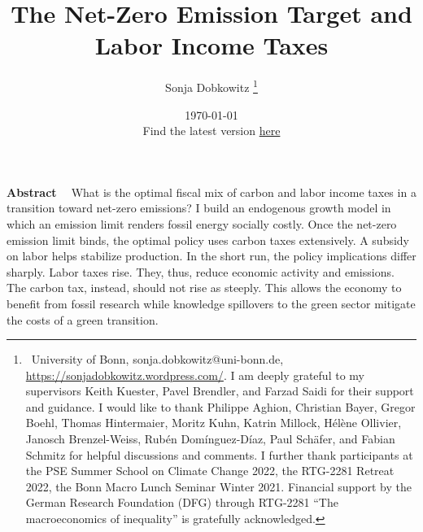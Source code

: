 \documentclass[12pt]{article}
\title{The Net-Zero Emission Target and Labor Income Taxes}
\author{Sonja Dobkowitz
\thanks{\ {University of Bonn, sonja.dobkowitz@uni-bonn.de, \url{https://sonjadobkowitz.wordpress.com/}.} \newline
	I am deeply grateful to my supervisors Keith Kuester, Pavel Brendler, and Farzad Saidi for their support and guidance. 
	I would like to thank Philippe Aghion, Christian Bayer, Gregor Boehl, Thomas Hintermaier,  Moritz Kuhn, Katrin Millock, Hélène Ollivier,  Janosch Brenzel-Weiss, Rubén Domínguez-Díaz, Paul Schäfer, and Fabian Schmitz for helpful discussions and comments.  
	I further thank participants at the PSE Summer School on Climate Change 2022, the RTG-2281 Retreat 2022, the Bonn Macro Lunch Seminar Winter 2021.
	Financial support by the German Research Foundation (DFG) through RTG-2281 “The macroeconomics of inequality” is gratefully acknowledged.}}
\date{\today \\ \vspace{1mm} \small{Find the latest version  \href{https://sonjadobkowitz.wordpress.com/job-market-paper/}{here}}
}
\renewenvironment{abstract}
{\small
	\list{}{
		\setlength{\leftmargin}{0.025\textwidth}%
		\setlength{\rightmargin}{\leftmargin}%
	}%
	\item\relax}
{\endlist}
\begin{document}
%	
	\maketitle
	\begin{abstract}
		\begin{onehalfspacing}
			\textbf{Abstract \ }
What is the optimal fiscal mix of  carbon and labor income taxes in a transition toward net-zero emissions? I build an endogenous growth model in which an emission limit renders fossil energy socially costly. Once the net-zero emission limit binds, the optimal policy uses carbon taxes extensively. A subsidy on labor helps stabilize production. In the short run, the policy implications differ sharply. Labor taxes rise. They, thus, reduce economic activity and emissions. The carbon tax, instead, should not rise as steeply. This allows the economy to benefit from fossil research while knowledge spillovers to the green sector mitigate the costs of a green transition.

			
		\end{onehalfspacing}
		\end{abstract}






%

%
%


\end{document}
